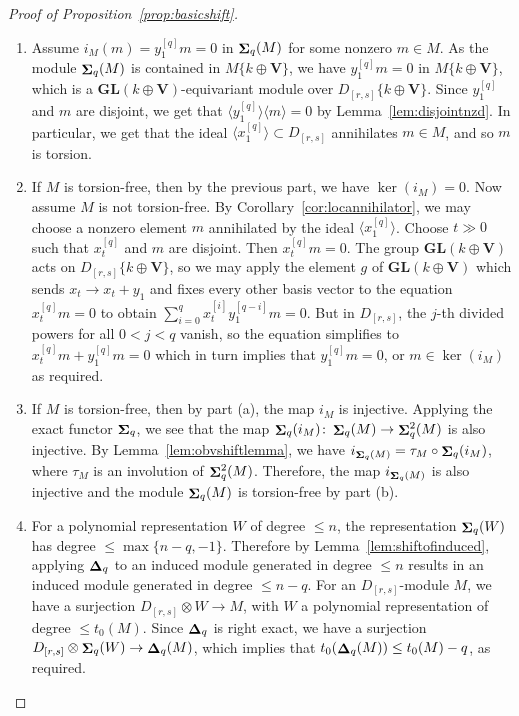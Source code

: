 \documentclass[12pt]{amsart}
\newcommand{\bV}{\mathbf{V}}
\DeclareMathOperator{\Sh}{\bf{\Sigma}}
\DeclareMathOperator{\De}{\bf{\Delta}}
\newcommand{\Drs}{D_{[r,s]}}
\newcommand{\mShq}{\Sh_{q}}
\newcommand{\mDeq}{\De_{q}}
\newcommand{\GL}{\mathbf{GL}}
\numberwithin{equation}{section}
\theoremstyle{definition}
\theoremstyle{plain}
\begin{document}
\begin{proof}[Proof of Proposition~\ref{prop:basicshift}] 
\leavevmode
\begin{enumerate}[label=(\alph*), wide=2.1em]
    \item  Assume $i_M(m) = y_1^{[q]}m = 0$ in $\mShq(M)$ for some nonzero $m \in M$. As the module $\mShq(M)$ is contained in $M\{k \oplus \bV\}$, we have $y_1^{[q]}m = 0$ in $M\{k \oplus \bV\}$, which is a $\GL(k \oplus \bV)$-equivariant module over $\Drs\{k \oplus \bV\}$. Since $y_1^{[q]}$ and $m$ are disjoint, we get that $\langle y_1^{[q]} \rangle \langle m \rangle = 0$ by Lemma~\ref{lem:disjointnzd}. In particular, we get that the ideal $\langle x_1^{[q]} \rangle \subset \Drs$ annihilates $m \in M$, and so $m$ is torsion.
    \item If $M$ is torsion-free, then by the previous part, we have $\ker(i_M)=0$. Now assume $M$ is not torsion-free. By Corollary~\ref{cor:locannihilator}, we may choose a nonzero element $m$ annihilated by the ideal $\langle x_1^{[q]} \rangle$. Choose $t \gg 0$ such that $x_t^{[q]}$ and $m$ are disjoint. Then $x_t^{[q]} m = 0$. The group $\GL(k \oplus \bV)$ acts on $\Drs\{k \oplus \bV\}$, so we may apply the element $g$ of $\GL(k \oplus \bV)$ which sends $x_t \to x_t + y_1$ and fixes every other basis vector to the equation $x_t^{[q]} m = 0$ to obtain $\sum_{i=0}^q x_t^{[i]} y_1^{[q-i]} m = 0$. But in $\Drs$, the $j$-th divided powers for all $0 < j < q$ vanish, so the equation simplifies to $x_t^{[q]} m + y_1^{[q]} m = 0$ which in turn implies that $y_1^{[q]} m =0$, or $m \in \ker(i_M)$ as required.
    \item If $M$ is torsion-free, then by part (a), the map $i_M$ is injective. Applying the exact functor $\mShq$, we see that the map $\mShq(i_M) \colon \mShq(M) \to \mShq^2(M)$ is also injective. By Lemma~\ref{lem:obvshiftlemma}, we have $i_{\mShq(M)} = \tau_M \circ \mShq(i_M)$, where $\tau_M$ is an involution of $\mShq^2(M)$. Therefore, the map $i_{\mShq(M)}$ is also injective and the module $\mShq(M)$ is torsion-free by part (b).
    \item  For a polynomial representation $W$ of degree $\le n$, the representation $\mShq(W)$ has degree $\le \max\{n-q,-1\}$.  Therefore by Lemma~\ref{lem:shiftofinduced}, applying $\mDeq$ to an induced module generated in degree $\le n$ results in an induced module generated in degree $\le n-q$. For an $\Drs$-module $M$, we have a surjection $\Drs\otimes W \to M$, with $W$ a polynomial representation of degree $\le t_0(M)$. Since $\mDeq$ is right exact, we have a surjection $\Drs \otimes \mShq(W) \to \mDeq(M)$, which implies that $t_0(\mDeq(M)) \le t_0(M) - q$, as required. 

\end{enumerate}
\end{proof}
\end{document}
